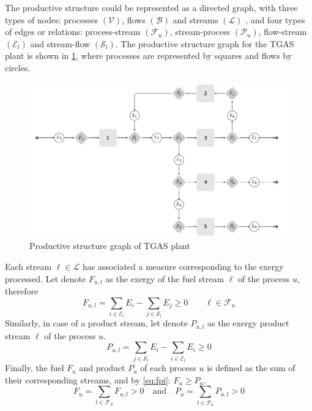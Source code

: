 \documentclass{ecos2018}
\begin{document}
The productive structure could be represented as a directed graph, with three types of nodes: processes $(\mathcal{V})$, flows $(\mathcal{B})$ and streams $(\mathcal{L})$ , and four types of edges or relations: process-stream  $(\mathcal{F}_u)$, stream-process $(\mathcal{P}_u)$, flow-stream $(\mathcal{E}_l)$ and stream-flow $(\mathcal{S}_l)$. The productive structure graph for the TGAS plant is shown in \cref{tgasfp}, where processes are represented by squares and flows by circles.

\begin{figure}[htpb]
	\centering
	\includegraphics[width=0.90\linewidth]{tgasfp1}
	\caption{Productive structure graph of TGAS plant}
	\label{tgasfp}
\end{figure}

Each stream $\ell \in \mathcal{L}$ has associated a measure corresponding to the exergy processed. Let denote $F_{u,l}$ as the exergy of the fuel stream $\ell$ of the process $u$, therefore
\begin{equation}
F_{u,l} = \sum_{i\in\mathcal{E}_l} E_i - \sum_{j\in\mathcal{S}_l} E_j \ge 0 \qquad \ell\in\mathcal{F}_u
\label{eq:fs}
\end{equation}
\label{eq2_3}
Similarly, in case of a product stream, let denote  $P_{u,l}$ as the exergy  product stream $\ell$ of the process $u$.
\begin{equation}
P_{u,l}=\sum_{j\in\mathcal{S}_l} E_i - \sum_{i\in\mathcal{E}_l} E_i \ge 0
\label{eq:ps}
\end{equation}
Finally, the fuel $F_u$ and product $P_u$ of each process $u$ is defined as the sum of their corresponding streams, and by \cref{eq:fpi}: $F_u \ge P_u$.
\begin{equation}
F_u=\sum_{l\in\mathcal{F}_u} F_{u,l} > 0 \quad\text{and} \quad P_u=\sum_{l\in\mathcal{P}_u} P_{u,l} > 0
\end{equation}
\end{document}
